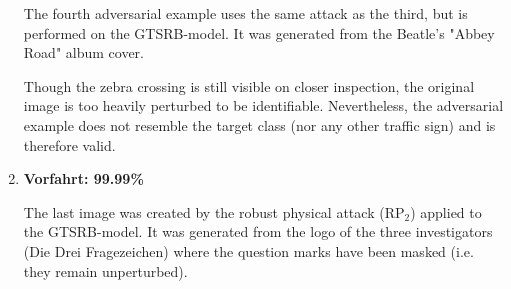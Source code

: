 \begin{enumerate}
The fourth adversarial example uses the same attack as the third, but is performed on the GTSRB-model.
It was generated from the Beatle's "Abbey Road" album cover.

Though the zebra crossing is still visible on closer inspection, the original image is too heavily perturbed to be identifiable. 
Nevertheless, the adversarial example does not resemble the target class (nor any other traffic sign) and is therefore valid.

\item
\textbf{Vorfahrt: 99.99\%}

The last image was created by the robust physical attack (RP$_2$) applied to the GTSRB-model.
It was generated from the logo of the three investigators (Die Drei Fragezeichen) where the question marks have been masked (i.e. they remain unperturbed).

\end{enumerate}

